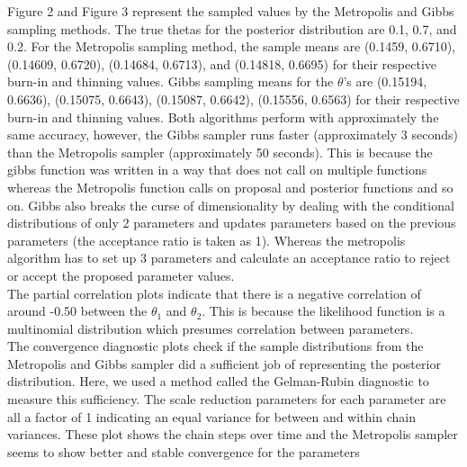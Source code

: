 \documentclass[11pt,a4paper]{article}
\begin{document}
Figure 2 and Figure 3 represent the sampled values by the Metropolis and Gibbs sampling methods. The true thetas for the posterior distribution are 0.1, 0.7, and 0.2. For the Metropolis sampling method, the sample means are (0.1459, 0.6710), (0.14609, 0.6720), (0.14684, 0.6713), and (0.14818, 0.6695) for their respective burn-in and thinning values. Gibbs sampling means for the $\theta$'s are (0.15194, 0.6636), (0.15075, 0.6643), (0.15087, 0.6642), (0.15556, 0.6563) for their respective burn-in and thinning values. Both algorithms perform with approximately the same accuracy, however, the Gibbs sampler runs faster (approximately 3 seconds) than the Metropolis sampler (approximately 50 seconds). This is because the gibbs function was written in a way that does not call on multiple functions whereas the Metropolis function calls on proposal and posterior functions and so on. Gibbs also breaks the curse of dimensionality by dealing with the conditional distributions of only 2 parameters and updates parameters based on the previous parameters (the acceptance ratio is taken as 1). Whereas the metropolis algorithm has to set up 3 parameters and calculate an acceptance ratio to reject or accept the proposed parameter values. \\

The partial correlation plots indicate that there is a negative correlation of around -0.50 between the $\theta_{1}$ and $\theta_{2}$. This is because the likelihood function is a multinomial distribution which presumes correlation between parameters. \\

The convergence diagnostic plots check if the sample distributions from the Metropolis and  Gibbs sampler did a sufficient job of representing the posterior distribution. Here, we used a method called the Gelman-Rubin diagnostic to measure this sufficiency. The scale reduction parameters for each parameter are all a factor of 1 indicating  an equal variance for between and within chain variances. These plot shows the chain steps over time and the Metropolis sampler seems to show better and stable convergence for the parameters

\end{document}
